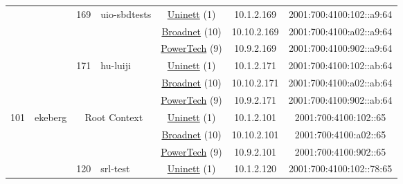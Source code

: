 \begin{small}
\begin{center}
\begin{longtable}{|c|c|c|c|c|c|c|c|}
  &  & \multirow{3}{*}{\tiny{169}} & \multicolumn{1}{|l|}{\multirow{3}{*}{\tiny{uio-sbdtests}}} & \multicolumn{2}{|c|}{\tiny{\href{https://www.uninett.no}{Uninett} (1)}} & \tiny{10.1.2.169} & \tiny{2001:700:4100:102::a9:64} \\* \cline{5-5}\cline{6-6}\cline{7-7}\cline{8-8}
  &  &  &  & \multicolumn{2}{|c|}{\tiny{\href{https://www.broadnet.no}{Broadnet} (10)}} & \tiny{10.10.2.169} & \tiny{2001:700:4100:a02::a9:64} \\* \cline{5-5}\cline{6-6}\cline{7-7}\cline{8-8}
  &  &  &  & \multicolumn{2}{|c|}{\tiny{\href{http://www.powertech.no}{PowerTech} (9)}} & \tiny{10.9.2.169} & \tiny{2001:700:4100:902::a9:64} \\* \cline{3-3}\cline{4-4}\cline{5-5}\cline{6-6}\cline{7-7}\cline{8-8}
  &  & \multirow{3}{*}{\tiny{171}} & \multicolumn{1}{|l|}{\multirow{3}{*}{\tiny{hu-luiji}}} & \multicolumn{2}{|c|}{\tiny{\href{https://www.uninett.no}{Uninett} (1)}} & \tiny{10.1.2.171} & \tiny{2001:700:4100:102::ab:64} \\* \cline{5-5}\cline{6-6}\cline{7-7}\cline{8-8}
  &  &  &  & \multicolumn{2}{|c|}{\tiny{\href{https://www.broadnet.no}{Broadnet} (10)}} & \tiny{10.10.2.171} & \tiny{2001:700:4100:a02::ab:64} \\* \cline{5-5}\cline{6-6}\cline{7-7}\cline{8-8}
  &  &  &  & \multicolumn{2}{|c|}{\tiny{\href{http://www.powertech.no}{PowerTech} (9)}} & \tiny{10.9.2.171} & \tiny{2001:700:4100:902::ab:64} \\ \hline
 \multirow{33}{*}{\tiny{101}} & \multicolumn{1}{|l|}{\multirow{33}{*}{\tiny{ekeberg}}} & \multicolumn{2}{|c|}{\multirow{3}{*}{\tiny{Root Context}}} & \multicolumn{2}{|c|}{\tiny{\href{https://www.uninett.no}{Uninett} (1)}} & \tiny{10.1.2.101} & \tiny{2001:700:4100:102::65} \\* \cline{5-5}\cline{6-6}\cline{7-7}\cline{8-8}
  &  & \multicolumn{2}{|c|}{} & \multicolumn{2}{|c|}{\tiny{\href{https://www.broadnet.no}{Broadnet} (10)}} & \tiny{10.10.2.101} & \tiny{2001:700:4100:a02::65} \\* \cline{5-5}\cline{6-6}\cline{7-7}\cline{8-8}
  &  & \multicolumn{2}{|c|}{} & \multicolumn{2}{|c|}{\tiny{\href{http://www.powertech.no}{PowerTech} (9)}} & \tiny{10.9.2.101} & \tiny{2001:700:4100:902::65} \\* \cline{3-3}\cline{4-4}\cline{5-5}\cline{6-6}\cline{7-7}\cline{8-8}
  &  & \multirow{3}{*}{\tiny{120}} & \multicolumn{1}{|l|}{\multirow{3}{*}{\tiny{srl-test}}} & \multicolumn{2}{|c|}{\tiny{\href{https://www.uninett.no}{Uninett} (1)}} & \tiny{10.1.2.120} & \tiny{2001:700:4100:102::78:65} \\* \cline{5-5}\cline{6-6}\cline{7-7}\cline{8-8}

\end{longtable}
\end{center}
\end{small}
